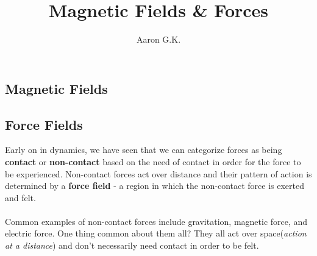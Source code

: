 \documentclass[9pt]{article}
\title{Magnetic Fields \& Forces}
\author{Aaron G.K.}
\begin{document}
	\maketitle
	\begin{center}
	\section*{Magnetic Fields}
	\end{center}	
	\subsection*{Force Fields}
	Early on in dynamics, we have seen that we can categorize forces as being \textbf{contact} or \textbf{non-contact} based on the need of contact in order for the force to be experienced. Non-contact forces act over distance and their pattern of action is determined by a \textbf{force field} - a region in which the non-contact force is exerted and felt.\\ \\
	Common examples of non-contact forces include gravitation, magnetic force, and electric force. One thing common about them all? They all act over space(\textit{action at a distance}) and don't necessarily need contact in order to be felt. 
\end{document}

